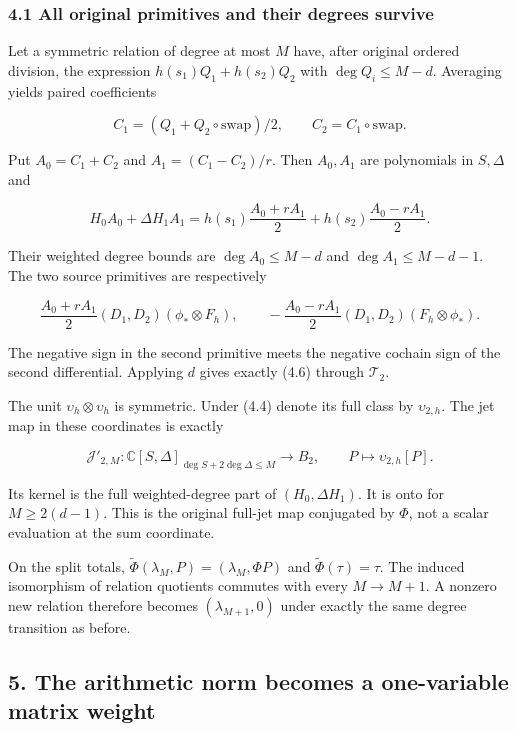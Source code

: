 \documentclass[
]{article}
\begin{document}
\subsubsection{4.1 All original primitives and their degrees
survive}\label{all-original-primitives-and-their-degrees-survive}

Let a symmetric relation of degree at most \(M\) have, after original
ordered division, the expression \(h(s_1)Q_1+h(s_2)Q_2\) with
\(\deg Q_i\le M-d\). Averaging yields paired coefficients

\[C_1=(Q_1+Q_2\circ\mathrm{swap})/2,\qquad C_2=C_1\circ\mathrm{swap}.\]

Put \(A_0=C_1+C_2\) and \(A_1=(C_1-C_2)/r\). Then \(A_0,A_1\) are
polynomials in \(S,\Delta\) and

\[H_0A_0+\Delta H_1A_1=h(s_1)\frac{A_0+rA_1}{2}
+h(s_2)\frac{A_0-rA_1}{2}.\tag{4.6}\]

Their weighted degree bounds are \(\deg A_0\le M-d\) and
\(\deg A_1\le M-d-1\). The two source primitives are respectively

\[\frac{A_0+rA_1}{2}(D_1,D_2)(\phi_*\otimes F_h),\qquad
-\frac{A_0-rA_1}{2}(D_1,D_2)(F_h\otimes\phi_*).\tag{4.7}\]

The negative sign in the second primitive meets the negative cochain
sign of the second differential. Applying \(d\) gives exactly (4.6)
through \(\mathcal T_2\).

The unit \(\upsilon_h\otimes\upsilon_h\) is symmetric. Under (4.4)
denote its full class by \(\upsilon_{2,h}\). The jet map in these
coordinates is exactly

\[\mathcal J'_{2,M}:\mathbb C[S,\Delta]_{\deg S+2\deg\Delta\le M}
\longrightarrow B_2,\qquad P\longmapsto\upsilon_{2,h}[P].\tag{4.8}\]

Its kernel is the full weighted-degree part of \((H_0,\Delta H_1)\). It
is onto for \(M\ge2(d-1)\). This is the original full-jet map conjugated
by \(\Phi\), not a scalar evaluation at the sum coordinate.

On the split totals, \(\widetilde\Phi(\lambda_M,P)=(\lambda_M,\Phi P)\)
and \(\widetilde\Phi(\tau)=\tau\). The induced isomorphism of relation
quotients commutes with every \(M\to M+1\). A nonzero new relation
therefore becomes \((\lambda_{M+1},0)\) under exactly the same degree
transition as before.

\subsection{5. The arithmetic norm becomes a one-variable matrix
weight}\label{the-arithmetic-norm-becomes-a-one-variable-matrix-weight}
\end{document}
